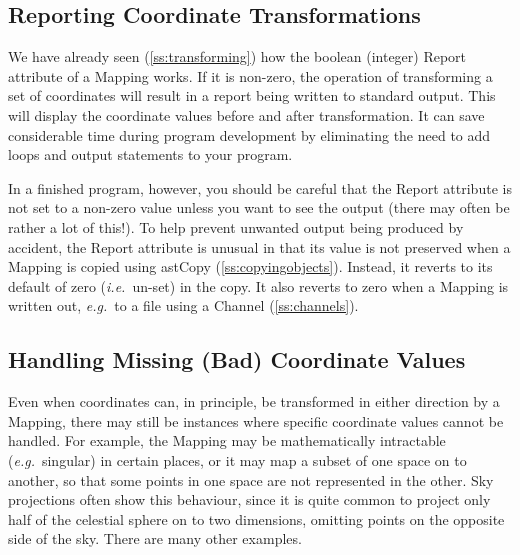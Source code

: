 \documentclass[twoside,11pt]{article}
\newcommand{\htmlref}[2]{#1}
\newcommand{\secref}[1]{\S\ref{#1}}
\renewcommand{\secref}[1]{\ref{#1}}
\begin{document}
\subsection{Reporting Coordinate Transformations}

We have already seen (\secref{ss:transforming}) how the boolean
(integer) \htmlref{Report}{Report} attribute of a \htmlref{Mapping}{Mapping} works. If it is non-zero, the
operation of transforming a set of coordinates will result in a report
being written to standard output. This will display the coordinate
values before and after transformation. It can save considerable time
during program development by eliminating the need to add loops and
output statements to your program.

In a finished program, however, you should be careful that the Report
attribute is not set to a non-zero value unless you want to see the
output (there may often be rather a lot of this!). To help prevent
unwanted output being produced by accident, the Report attribute is
unusual in that its value is not preserved when a Mapping is copied
using \htmlref{astCopy}{astCopy} (\secref{ss:copyingobjects}). Instead, it reverts to its
default of zero ({\em{i.e.}}\ un-set) in the copy. It also reverts to
zero when a Mapping is written out, {\em{e.g.}}\ to a file using a
\htmlref{Channel}{Channel} (\secref{ss:channels}).


\subsection{\label{ss:badcoordinates}Handling Missing (Bad) Coordinate Values}

Even when coordinates can, in principle, be transformed in either
direction by a \htmlref{Mapping}{Mapping}, there may still be instances where specific
coordinate values cannot be handled. For example, the Mapping may be
mathematically intractable ({\em{e.g.}}\ singular) in certain places,
or it may map a subset of one space on to another, so that some points
in one space are not represented in the other.  Sky projections often
show this behaviour, since it is quite common to project only half of
the celestial sphere on to two dimensions, omitting points on the
opposite side of the sky. There are many other examples.
\end{document}
